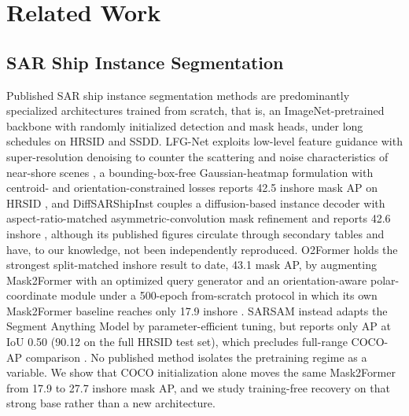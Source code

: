 \section{Related Work}
\label{sec:related}

\subsection{SAR Ship Instance Segmentation}
\label{sec:related-sar}
Published SAR ship instance segmentation methods are predominantly specialized architectures trained from scratch, that is, an ImageNet-pretrained backbone with randomly initialized detection and mask heads, under long schedules on HRSID and SSDD. LFG-Net exploits low-level feature guidance with super-resolution denoising to counter the scattering and noise characteristics of near-shore scenes \cite{lfgnet2022}, a bounding-box-free Gaussian-heatmap formulation with centroid- and orientation-constrained losses reports 42.5 inshore mask AP on HRSID \cite{gaussheatmap2024}, and DiffSARShipInst couples a diffusion-based instance decoder with aspect-ratio-matched asymmetric-convolution mask refinement and reports 42.6 inshore \cite{diffsar2025}, although its published figures circulate through secondary tables and have, to our knowledge, not been independently reproduced. O2Former holds the strongest split-matched inshore result to date, 43.1 mask AP, by augmenting Mask2Former \cite{mask2former2022} with an optimized query generator and an orientation-aware polar-coordinate module under a 500-epoch from-scratch protocol in which its own Mask2Former baseline reaches only 17.9 inshore \cite{o2former2025}. SARSAM instead adapts the Segment Anything Model by parameter-efficient tuning, but reports only AP at IoU 0.50 (90.12 on the full HRSID test set), which precludes full-range COCO-AP comparison \cite{sarsam2025}. No published method isolates the pretraining regime as a variable. We show that COCO initialization alone moves the same Mask2Former from 17.9 to 27.7 inshore mask AP, and we study training-free recovery on that strong base rather than a new architecture.

